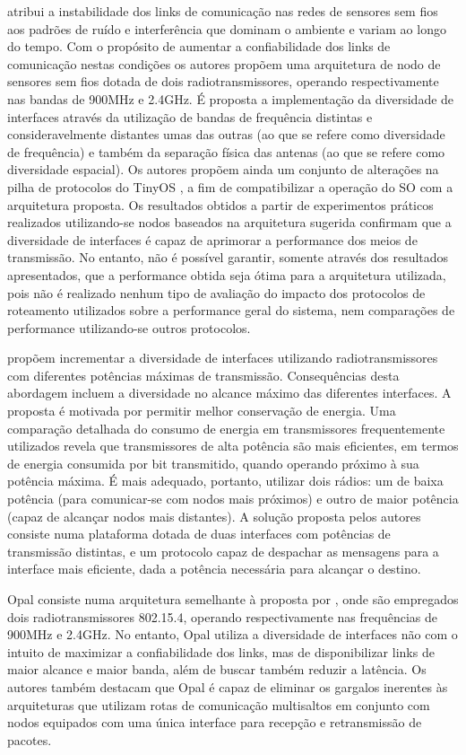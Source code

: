 \documentclass[
	12pt,				%
	openright,			%
	oneside,
	a4paper,			%
	english,			%
	french,				%
	spanish,			%
	brazil				%
	]{abntex2}
\begin{document}
 atribui a instabilidade dos links de comunicação nas redes de sensores sem fios aos padrões de ruído e interferência que dominam o ambiente e variam ao longo do tempo. Com o propósito de aumentar a confiabilidade dos links de comunicação nestas condições os autores propõem uma arquitetura de nodo de sensores sem fios dotada de dois radiotransmissores, operando respectivamente nas bandas de 900MHz e 2.4GHz. É proposta a implementação da diversidade de interfaces através da utilização de bandas de frequência distintas e consideravelmente distantes umas das outras (ao que se refere como diversidade de frequência) e também da separação física das antenas (ao que se refere como diversidade espacial). Os autores propõem ainda um conjunto de alterações na pilha de protocolos do TinyOS \cite{Levis2005}, a fim de compatibilizar a operação do SO com a arquitetura proposta. Os resultados obtidos a partir de experimentos práticos realizados utilizando-se nodos baseados na arquitetura sugerida confirmam que a diversidade de interfaces é capaz de aprimorar a performance dos meios de transmissão. No entanto, não é possível garantir, somente através dos resultados apresentados, que a performance obtida seja ótima para a arquitetura utilizada, pois não é realizado nenhum tipo de avaliação do impacto dos protocolos de roteamento utilizados sobre a performance geral do sistema, nem comparações de performance utilizando-se outros protocolos.

\cite{Gummeson2010} propõem incrementar a diversidade de interfaces utilizando radiotransmissores com diferentes potências máximas de transmissão. Consequências desta abordagem incluem a diversidade no alcance máximo das diferentes interfaces. A proposta é motivada por permitir melhor conservação de energia. Uma comparação detalhada do consumo de energia em transmissores frequentemente utilizados revela que transmissores de alta potência são mais eficientes, em termos de energia consumida por bit transmitido, quando operando próximo à sua potência máxima. É mais adequado, portanto, utilizar dois rádios: um de baixa potência (para comunicar-se com nodos mais próximos) e outro de maior potência (capaz de alcançar nodos mais distantes). A solução proposta pelos autores consiste numa plataforma dotada de duas interfaces com potências de transmissão distintas, e um protocolo capaz de despachar as mensagens para a interface mais eficiente, dada a potência necessária para alcançar o destino.

Opal \cite{Jurdak2011} consiste numa arquitetura semelhante à proposta por \cite{Kusy2011}, onde são empregados dois radiotransmissores 802.15.4, operando respectivamente nas frequências de 900MHz e 2.4GHz. No entanto, Opal utiliza a diversidade de interfaces não com o intuito de maximizar a confiabilidade dos links, mas de disponibilizar links de maior alcance e maior banda, além de buscar também reduzir a latência. Os autores também destacam que Opal é capaz de eliminar os gargalos inerentes às arquiteturas que utilizam rotas de comunicação multisaltos em conjunto com nodos equipados com uma única interface para recepção e retransmissão de pacotes.
\end{document}
